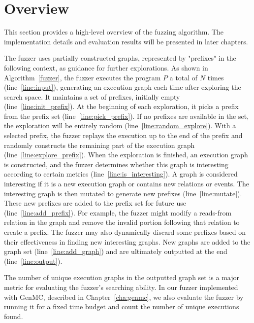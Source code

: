 \section{Overview}


This section provides a high-level overview of the fuzzing algorithm. The implementation details and evaluation results will be presented in later chapters.





The fuzzer uses partially constructed graphs, represented by "prefixes" in the following context, as guidance for further explorations. As shown in Algorithm~\ref{fuzzer}, the fuzzer executes the program $P$ a total of $N$ times (line~\ref{line:input}), generating an execution graph each time after exploring the search space. It maintains a set of prefixes, initially empty (line~\ref{line:init_prefix}). At the beginning of each exploration, it picks a prefix from the prefix set (line~\ref{line:pick_prefix}). If no prefixes are available in the set, the exploration will be entirely random (line~\ref{line:random_explore}). With a selected prefix, the fuzzer replays the execution up to the end of the prefix and randomly constructs the remaining part of the execution graph (line~\ref{line:explore_prefix}). When the exploration is finished, an execution graph is constructed, and the fuzzer determines whether this graph is interesting according to certain metrics (line~\ref{line:is_interesting}). A graph is considered interesting if it is a new execution graph or contains new relations or events. The interesting graph is then mutated to generate new prefixes (line~\ref{line:mutate}). These new prefixes are added to the prefix set for future use (line~\ref{line:add_prefix}). For example, the fuzzer might modify a reads-from relation in the graph and remove the invalid portion following that relation to create a prefix. The fuzzer may also dynamically discard some prefixes based on their effectiveness in finding new interesting graphs. New graphs are added to the graph set (line~\ref{line:add_graph}) and are ultimately outputted at the end (line~\ref{line:output}). 

The number of unique execution graphs in the outputted graph set is a major metric for evaluating the fuzzer's searching ability. In our fuzzer implemented with GenMC, described in Chapter~\ref{cha:genmc}, we also evaluate the fuzzer by running it for a fixed time budget and count the number of unique executions found.



